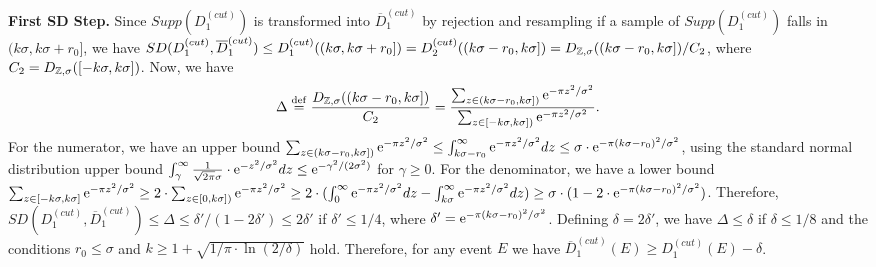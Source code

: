 \begin{sloppypar}
  \textbf{First SD Step.} Since $Supp(D_1^{(cut)})$ is transformed into
  $\overline{D}_1^{(cut)}$ by rejection and resampling if a sample of
  $Supp(D_1^{(cut)})$ falls in $(k\sigma,k\sigma+r_0]$, we have
  $SD(D_1^{(cut)}, \overline{D}_1^{(cut)}) \leq
  D_1^{(cut)}((k\sigma,k\sigma+r_0]) = D_2^{(cut)}((k\sigma-r_0,k\sigma]) =
  D_{\mathbb{Z},\sigma}((k\sigma-r_0,k\sigma])/C_2$, where
  $C_2 = D_{\mathbb{Z},\sigma}([-k\sigma,k\sigma])$. Now, we have
$$
\Delta \stackrel{\mathrm{def}}{=} \frac{D_{\mathbb{Z},\sigma}((k\sigma-r_0,k\sigma])}{C_2} = \frac{\sum_{z
    \in (k\sigma-r_0,k\sigma])} \mathrm{e}^{-\pi z^2/\sigma^2}}{\sum_{z \in
    [-k\sigma,k\sigma])} \mathrm{e}^{-\pi z^2/\sigma^2}}.
$$
For the numerator, we have an upper bound
$\sum_{z \in (k\sigma-r_0,k\sigma])} \mathrm{e}^{-\pi z^2/\sigma^2} \leq
\int^{\infty}_{k\sigma-r_0} \mathrm{e}^{-\pi z^2/\sigma^2} dz \leq \sigma \cdot \mathrm{e}^{-\pi
  (k\sigma-r_0)^2/\sigma^2}$, using the standard normal distribution upper bound
$\int^{\infty}_{\gamma} \frac{1}{\sqrt{2\pi} \sigma} \cdot \mathrm{e}^{- z^2/\sigma^2}
dz \leq \mathrm{e}^{-\gamma^2/(2\sigma^2)}$ for $\gamma \geq 0$. For the denominator, we
have a lower bound
$\sum_{z \in [-k\sigma,k\sigma]} \mathrm{e}^{-\pi z^2/\sigma^2} \geq 2 \cdot \sum_{z \in
  [0,k\sigma])} \mathrm{e}^{-\pi z^2/\sigma^2} \geq 2 \cdot (\int^{\infty}_{0} \mathrm{e}^{-\pi
  z^2/\sigma^2} dz - \int^{\infty}_{k\sigma} \mathrm{e}^{-\pi z^2/\sigma^2} dz) \geq
\sigma \cdot (1 - 2 \cdot \mathrm{e}^{-\pi (k\sigma-r_0)^2/\sigma^2})$. Therefore,
$SD(D_1^{(cut)}, \overline{D}_1^{(cut)}) \leq \Delta \leq \delta' / (1-2\delta')
\leq 2\delta'$ if $\delta' \leq 1/4$, where
$\delta' = \mathrm{e}^{-\pi (k\sigma-r_0)^2/\sigma^2}$. Defining $\delta = 2\delta'$, we
have $\Delta \leq \delta$ if $\delta \leq 1/8$ and the conditions
$r_0 \leq \sigma$ and $k \geq 1 + \sqrt{1/\pi \cdot \ln(2/\delta)}$
hold. Therefore, for any event $E$ we have
$\overline{D}_1^{(cut)}(E) \geq D_1^{(cut)}(E) - \delta$.
\end{sloppypar}

